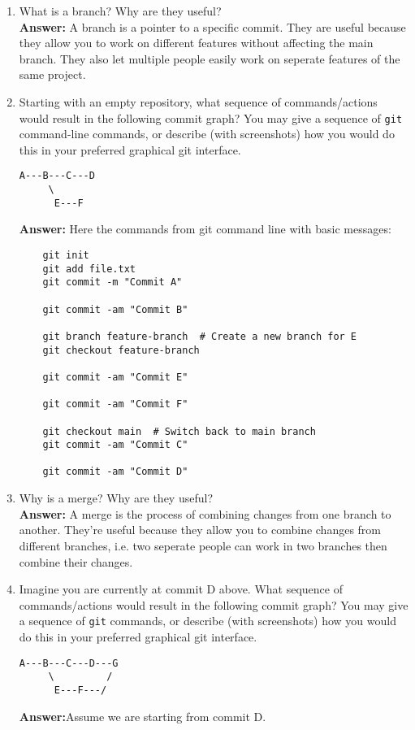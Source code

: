 \documentclass[10pt,twocolumn]{article}
\begin{document}
\begin{enumerate}
\item What is a branch? Why are they useful?\\
    \textbf{Answer:}
    A branch is a pointer to a specific commit. They are useful because they allow you to work on different features without affecting the main branch. They also let multiple people easily work on seperate features of the same project.

\item Starting with an empty repository, what sequence of commands/actions would result in the following commit graph? You may give a sequence of \texttt{git} command-line commands, or describe (with screenshots) how you would do this in your preferred graphical git interface.
\begin{verbatim}
A---B---C---D
     \
      E---F
\end{verbatim}
    \textbf{Answer:} Here the commands from git command line with basic messages:
\begin{verbatim}
    git init
    git add file.txt
    git commit -m "Commit A"

    git commit -am "Commit B"

    git branch feature-branch  # Create a new branch for E
    git checkout feature-branch

    git commit -am "Commit E"

    git commit -am "Commit F"

    git checkout main  # Switch back to main branch
    git commit -am "Commit C"

    git commit -am "Commit D"
\end{verbatim}

\item Why is a merge? Why are they useful?\\
    \textbf{Answer:}
    A merge is the process of combining changes from one branch to another. They're useful because they allow you to combine changes from different branches, i.e. two seperate people can work in two branches then combine their changes.

\item Imagine you are currently at commit D above. What sequence of commands/actions would result in the following commit graph? You may give a sequence of \texttt{git} commands, or describe (with screenshots) how you would do this in your preferred graphical git interface.
\begin{verbatim}
A---B---C---D---G
     \         /
      E---F---/
\end{verbatim}
    \textbf{Answer:}Assume we are starting from commit D.


\end{enumerate}
\end{document}
